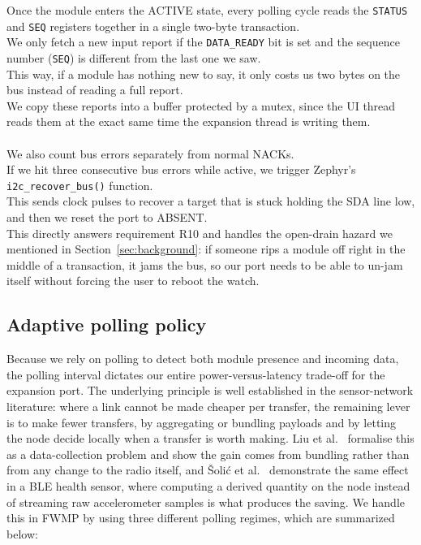 \documentclass[12pt, a4paper]{article}
\begin{document}
Once the module enters the ACTIVE state, every polling cycle reads the \texttt{STATUS} and \texttt{SEQ} registers together in a single two-byte transaction. \\
We only fetch a new input report if the \texttt{DATA\_READY} bit is set and the sequence number (\texttt{SEQ}) is different from the last one we saw. \\
This way, if a module has nothing new to say, it only costs us two bytes on the bus instead of reading a full report. \\
We copy these reports into a buffer protected by a mutex, since the UI thread reads them at the exact same time the expansion thread is writing them.\\\\
We also count bus errors separately from normal  NACKs. \\
If we hit three consecutive bus errors while active, we trigger Zephyr's \texttt{i2c\_recover\_bus()} function. \\
This sends clock pulses to recover a target that is stuck holding the SDA line low, and then we reset the port to ABSENT. \\
This directly answers requirement R10 and handles the open-drain hazard we mentioned in Section~\ref{sec:background}: if someone rips a module off right in the middle of a transaction, it jams the bus, so our port needs to be able to un-jam itself without forcing the user to reboot the watch.
\newpage
\subsection{Adaptive polling policy}
\label{sec:fwmp:poll}

Because we rely on polling to detect both module presence and incoming data, the polling interval dictates our entire power-versus-latency trade-off for the expansion port. The underlying principle is well established in the sensor-network literature: where a link cannot be made cheaper per transfer, the remaining lever is to make fewer transfers, by aggregating or bundling payloads and by letting the node decide locally when a transfer is worth making. Liu et al.~\cite{liu2024} formalise this as a data-collection problem and show the gain comes from bundling rather than from any change to the radio itself, and \v{S}oli\'{c} et al.~\cite{solic2024} demonstrate the same effect in a BLE health sensor, where computing a derived quantity on the node instead of streaming raw accelerometer samples is what produces the saving. We handle this in FWMP by using three different polling regimes, which are summarized below:
\end{document}
